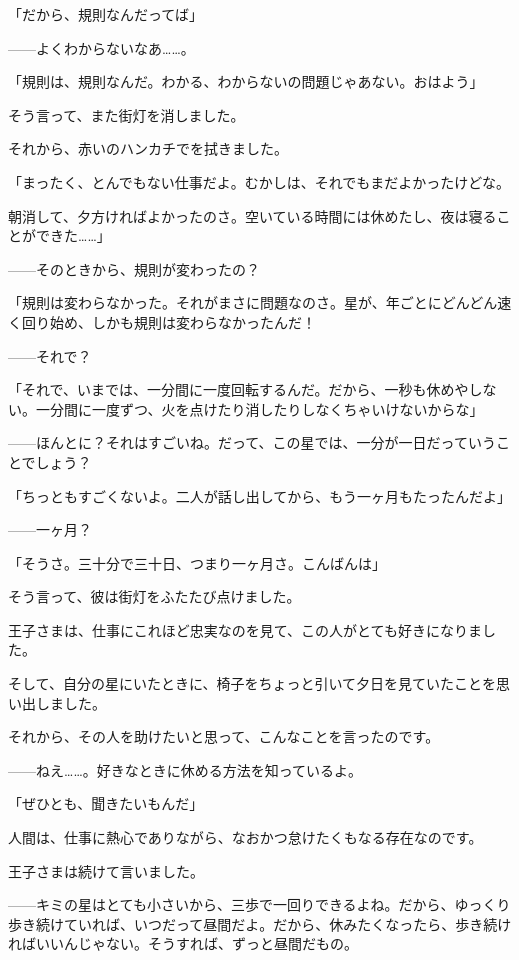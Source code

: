「だから、規則なんだってば」

——よくわからないなあ……。

「規則は、規則なんだ。わかる、わからないの問題じゃあない。おはよう」

そう言って、また街灯を消しました。

それから、赤いのハンカチでを拭きました。

「まったく、とんでもない仕事だよ。むかしは、それでもまだよかったけどな。

朝消して、夕方ければよかったのさ。空いている時間には休めたし、夜は寝ることができた……」

——そのときから、規則が変わったの？

「規則は変わらなかった。それがまさに問題なのさ。星が、年ごとにどんどん速く回り始め、しかも規則は変わらなかったんだ！

——それで？

「それで、いまでは、一分間に一度回転するんだ。だから、一秒も休めやしない。一分間に一度ずつ、火を点けたり消したりしなくちゃいけないからな」

——ほんとに？それはすごいね。だって、この星では、一分が一日だっていうことでしょう？

「ちっともすごくないよ。二人が話し出してから、もう一ヶ月もたったんだよ」

——一ヶ月？

「そうさ。三十分で三十日、つまり一ヶ月さ。こんばんは」

そう言って、彼は街灯をふたたび点けました。

王子さまは、仕事にこれほど忠実なのを見て、この人がとても好きになりました。

そして、自分の星にいたときに、椅子をちょっと引いて夕日を見ていたことを思い出しました。

それから、その人を助けたいと思って、こんなことを言ったのです。

——ねえ……。好きなときに休める方法を知っているよ。

「ぜひとも、聞きたいもんだ」

人間は、仕事に熱心でありながら、なおかつ怠けたくもなる存在なのです。

王子さまは続けて言いました。

——キミの星はとても小さいから、三歩で一回りできるよね。だから、ゆっくり歩き続けていれば、いつだって昼間だよ。だから、休みたくなったら、歩き続ければいいんじゃない。そうすれば、ずっと昼間だもの。


